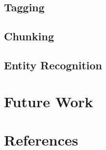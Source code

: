 \documentclass{acm_proc_article-sp}
\begin{document}
\subsection{Tagging}
\subsection{Chunking}
\subsection{Entity Recognition}
\section{Future Work}
\section{References}
{}

\end{document}
